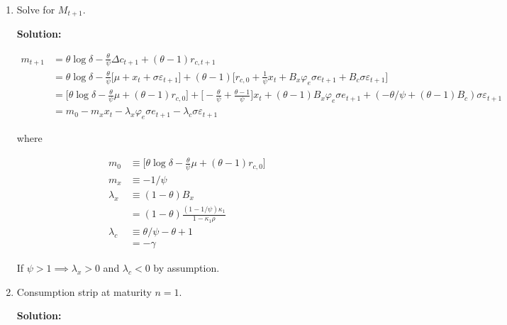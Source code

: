\documentclass{article}
\begin{document}
\begin{enumerate}
\pagebreak

\item Solve for $M_{t+1}$.

\bigskip

\textbf{Solution:} 

\begin{align*}
m_{t+1} 
&= \theta \log \delta - \frac{\theta}{\psi} \Delta c_{t+1} + (\theta - 1)r_{c,t+1}\\
&= \theta \log \delta - \frac{\theta}{\psi} \Bigg[\mu + x_t + \sigma \varepsilon_{t+1} \Bigg] + (\theta - 1)\Bigg[r_{c,0} +  \frac{1}{\psi} x_t  + B_x \varphi_e \sigma e_{t+1} + B_c \sigma \varepsilon_{t+1}\Bigg]\\
&= \Bigg[\theta \log \delta - \frac{\theta}{\psi} \mu + (\theta - 1) r_{c,0}\Bigg]
+ \Bigg[-\frac{\theta}{\psi} + \frac{\theta - 1}{\psi} \Bigg] x_t
+ (\theta - 1)B_x \varphi_e \sigma e_{t+1}
+ (-\theta/\psi + (\theta - 1)B_c) \sigma \varepsilon_{t+1}\\
&= m_0 - m_x x_t -\lambda_x \varphi_e \sigma e_{t+1} - \lambda_c \sigma \varepsilon_{t+1}
\end{align*}

where

\begin{align*}
m_0 &\equiv \Bigg[\theta \log \delta - \frac{\theta}{\psi} \mu + (\theta - 1) r_{c,0}\Bigg]\\
m_x &\equiv -1/\psi \\
\lambda_x 
&\equiv (1 - \theta) B_x\\
&= (1 - \theta )\frac{(1-1/\psi)\kappa_1 }{1- \kappa_1 \rho}\\
\lambda_c 
&\equiv \theta/\psi - \theta + 1 \\
&= - \gamma
\end{align*}

If $\psi > 1 \implies \lambda_x > 0$ and $\lambda_c < 0$ by assumption.

\bigskip

\item Consumption strip at maturity $n = 1$.

\bigskip

\textbf{Solution:}


\end{enumerate}
\end{document}
